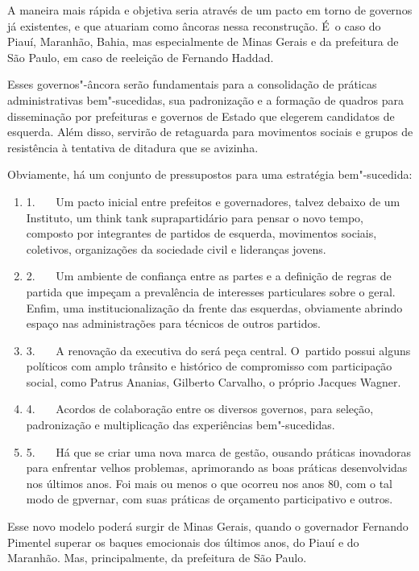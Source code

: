 A maneira mais rápida e objetiva seria através de um pacto em torno de
governos já existentes, e que atuariam como âncoras nessa reconstrução.
É~o caso do Piauí, Maranhão, Bahia, mas especialmente de Minas Gerais e
da prefeitura de São Paulo, em caso de reeleição de Fernando Haddad.

Esses governos"-âncora serão fundamentais para a consolidação de práticas
administrativas bem"-sucedidas, sua padronização e a formação de quadros
para disseminação por prefeituras e governos de Estado que elegerem
candidatos de esquerda. Além disso, servirão de retaguarda para
movimentos sociais e grupos de resistência à tentativa de ditadura que
se avizinha.

Obviamente, há um conjunto de pressupostos para uma estratégia
bem"-sucedida:

\begin{enumerate}
\itemsep1pt\parskip0pt
\item
  1.~~~ Um pacto inicial entre prefeitos e governadores, talvez debaixo
  de um Instituto, um think tank suprapartidário para pensar o novo
  tempo, composto por integrantes de partidos de esquerda, movimentos
  sociais, coletivos, organizações da sociedade civil e lideranças
  jovens.
\item
  2.~~~ Um ambiente de confiança entre as partes e a definição de regras
  de partida que impeçam a prevalência de interesses particulares sobre
  o geral. Enfim, uma institucionalização da frente das esquerdas,
  obviamente abrindo espaço nas administrações para técnicos de outros
  partidos.
\item
  3.~~~ A renovação da executiva do  será peça central. O~partido
  possui alguns políticos com amplo trânsito e histórico de compromisso
  com participação social, como Patrus Ananias, Gilberto Carvalho, o
  próprio Jacques Wagner.
\item
  4.~~~ Acordos de colaboração entre os diversos governos, para seleção,
  padronização e multiplicação das experiências bem"-sucedidas.
\item
  5.~~~ Há que se criar uma nova marca de gestão, ousando práticas
  inovadoras para enfrentar velhos problemas, aprimorando as boas
  práticas desenvolvidas nos últimos anos. Foi mais ou menos o que
  ocorreu nos anos 80, com o tal modo  de gpvernar, com suas práticas
  de orçamento participativo e outros.
\end{enumerate}

Esse novo modelo poderá surgir de Minas Gerais, quando o governador
Fernando Pimentel superar os baques emocionais dos últimos anos, do
Piauí e do Maranhão. Mas, principalmente, da prefeitura de São Paulo.

